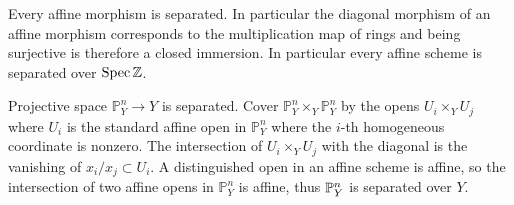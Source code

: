 \documentclass[12pt]{article}
\begin{document}
\begin{example}
    Every affine morphism is separated. In particular the diagonal morphism of an affine morphism corresponds to the multiplication map of rings and being surjective is therefore a closed immersion. In particular every affine scheme is separated over $\Spec \mathbb Z$.
\end{example}

\begin{example}
    Projective space $\mathbb P^n_Y\to Y$ is separated. Cover $\mathbb P^n_Y\times_Y \mathbb P^n_Y$ by the opens $U_i\times_Y U_j$ where $U_i$ is the standard affine open in $\mathbb P^n_Y$ where the $i$-th homogeneous coordinate is nonzero. The intersection of $U_i\times_Y U_j$ with the diagonal is the vanishing of $x_i/x_j \subset U_i$. A distinguished open in an affine scheme is affine, so the intersection of two affine opens in $\mathbb P^n_Y$ is affine, thus $\P^n_Y$ is separated over $Y$.
\end{example}
\end{document}
